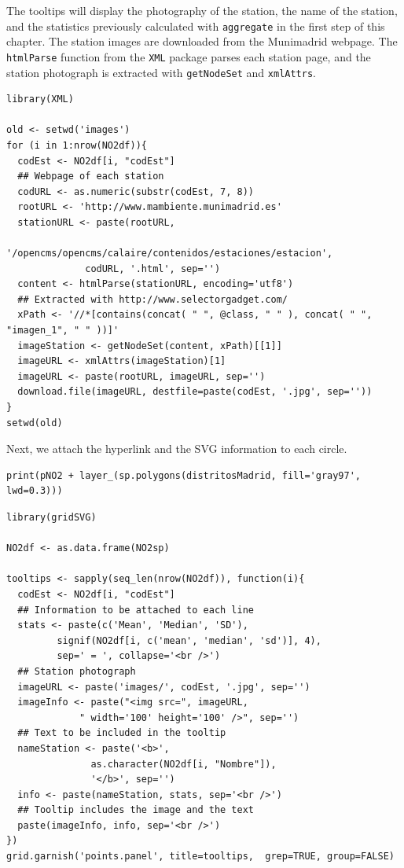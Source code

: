 \documentclass[smallroyalvopaper]{memoir}
\begin{document}
The tooltips will display the photography of the station, the name of
the station, and the statistics previously calculated with \texttt{aggregate}
in the first step of this chapter.  The station images are downloaded
from the Munimadrid webpage. The \texttt{htmlParse} function from the \texttt{XML}
package parses each station page, and the station photograph is
extracted with \texttt{getNodeSet} and \texttt{xmlAttrs}.


\lstset{language=R,numbers=none}
\begin{lstlisting}
library(XML)

old <- setwd('images')
for (i in 1:nrow(NO2df)){
  codEst <- NO2df[i, "codEst"]
  ## Webpage of each station
  codURL <- as.numeric(substr(codEst, 7, 8))
  rootURL <- 'http://www.mambiente.munimadrid.es'
  stationURL <- paste(rootURL,
		      '/opencms/opencms/calaire/contenidos/estaciones/estacion',
		      codURL, '.html', sep='')
  content <- htmlParse(stationURL, encoding='utf8')
  ## Extracted with http://www.selectorgadget.com/
  xPath <- '//*[contains(concat( " ", @class, " " ), concat( " ", "imagen_1", " " ))]'
  imageStation <- getNodeSet(content, xPath)[[1]]
  imageURL <- xmlAttrs(imageStation)[1]
  imageURL <- paste(rootURL, imageURL, sep='')
  download.file(imageURL, destfile=paste(codEst, '.jpg', sep=''))
}
setwd(old)
\end{lstlisting}

Next, we attach the hyperlink and the SVG information to each
circle.



\lstset{language=R,numbers=none}
\begin{lstlisting}
print(pNO2 + layer_(sp.polygons(distritosMadrid, fill='gray97', lwd=0.3)))
\end{lstlisting}

\lstset{language=R,numbers=none}
\begin{lstlisting}
library(gridSVG)

NO2df <- as.data.frame(NO2sp)

tooltips <- sapply(seq_len(nrow(NO2df)), function(i){
  codEst <- NO2df[i, "codEst"]
  ## Information to be attached to each line
  stats <- paste(c('Mean', 'Median', 'SD'),
		 signif(NO2df[i, c('mean', 'median', 'sd')], 4),
		 sep=' = ', collapse='<br />')
  ## Station photograph 
  imageURL <- paste('images/', codEst, '.jpg', sep='')
  imageInfo <- paste("<img src=", imageURL,
		     " width='100' height='100' />", sep='')
  ## Text to be included in the tooltip
  nameStation <- paste('<b>', 
		       as.character(NO2df[i, "Nombre"]),
		       '</b>', sep='')
  info <- paste(nameStation, stats, sep='<br />')
  ## Tooltip includes the image and the text
  paste(imageInfo, info, sep='<br />')
})
grid.garnish('points.panel', title=tooltips,  grep=TRUE, group=FALSE)
\end{lstlisting}
\end{document}
